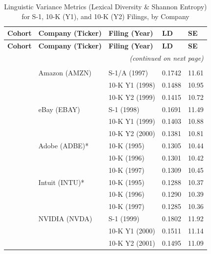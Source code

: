 \documentclass[12pt]{article}
\begin{document}
\begin{longtable}{@{}lllll@{}}
\caption{Linguistic Variance Metrics (Lexical Diversity \& Shannon Entropy) for S-1, 10-K (Y1), and 10-K (Y2) Filings, by Company}\label{tab:ld-se}\\
\toprule
\textbf{Cohort} & \textbf{Company (Ticker)} & \textbf{Filing (Year)} & \textbf{LD} & \textbf{SE} \\
\midrule
\endfirsthead
\toprule
\textbf{Cohort} & \textbf{Company (Ticker)} & \textbf{Filing (Year)} & \textbf{LD} & \textbf{SE} \\
\midrule
\endhead
\midrule
\multicolumn{5}{r}{\emph{(continued on next page)}}\\
\midrule
\endfoot
\bottomrule
\endlastfoot

\multicolumn{5}{@{}l}{\textbf{Group 1: Pre-Bubble Tech (Pre-SOX)}}\\
 & Amazon (AMZN) & S-1/A (1997) & 0.1742 & 11.61 \\
 &  & 10-K Y1 (1998) & 0.1488 & 10.95 \\
 &  & 10-K Y2 (1999) & 0.1415 & 10.72 \\
 & eBay (EBAY) & S-1 (1998) & 0.1691 & 11.49 \\
 &  & 10-K Y1 (1999) & 0.1403 & 10.88 \\
 &  & 10-K Y2 (2000) & 0.1381 & 10.81 \\
 & Adobe (ADBE)* & 10-K (1995) & 0.1305 & 10.44 \\
 &  & 10-K (1996) & 0.1301 & 10.42 \\
 &  & 10-K (1997) & 0.1309 & 10.45 \\
 & Intuit (INTU)* & 10-K (1995) & 0.1288 & 10.37 \\
 &  & 10-K (1996) & 0.1290 & 10.39 \\
 &  & 10-K (1997) & 0.1285 & 10.36 \\
 & NVIDIA (NVDA) & S-1 (1999) & 0.1802 & 11.92 \\
 &  & 10-K Y1 (2000) & 0.1511 & 11.14 \\
 &  & 10-K Y2 (2001) & 0.1495 & 11.09 \\[2pt]


\end{longtable}
\end{document}
